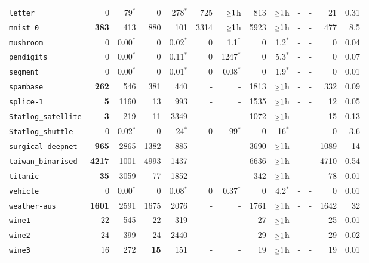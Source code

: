 \begin{tabular}{lrrrrrrrrrrrr}
\texttt{letter} & 0 & 79$^*$ & 0 & 278$^*$ & 725 & $\mathsmaller{\geq}1$h & 813 & $\mathsmaller{\geq}1$h & - & - & 21 & 0.31\\
\texttt{mnist\_0} & \textbf{383} & 413 & 880 & 101 & 3314 & $\mathsmaller{\geq}1$h & 5923 & $\mathsmaller{\geq}1$h & - & - & 477 & 8.5\\
\texttt{mushroom} & 0 & 0.00$^*$ & 0 & 0.02$^*$ & 0 & 1.1$^*$ & 0 & 1.2$^*$ & - & - & 0 & 0.04\\
\texttt{pendigits} & 0 & 0.00$^*$ & 0 & 0.11$^*$ & 0 & 1247$^*$ & 0 & 5.3$^*$ & - & - & 0 & 0.07\\
\texttt{segment} & 0 & 0.00$^*$ & 0 & 0.01$^*$ & 0 & 0.08$^*$ & 0 & 1.9$^*$ & - & - & 0 & 0.01\\
\texttt{spambase} & \textbf{262} & 546 & 381 & 440 & - & - & 1813 & $\mathsmaller{\geq}1$h & - & - & 332 & 0.09\\
\texttt{splice-1} & \textbf{5} & 1160 & 13 & 993 & - & - & 1535 & $\mathsmaller{\geq}1$h & - & - & 12 & 0.05\\
\texttt{Statlog\_satellite} & \textbf{3} & 219 & 11 & 3349 & - & - & 1072 & $\mathsmaller{\geq}1$h & - & - & 15 & 0.13\\
\texttt{Statlog\_shuttle} & 0 & 0.02$^*$ & 0 & 24$^*$ & 0 & 99$^*$ & 0 & 16$^*$ & - & - & 0 & 3.6\\
\texttt{surgical-deepnet} & \textbf{965} & 2865 & 1382 & 885 & - & - & 3690 & $\mathsmaller{\geq}1$h & - & - & 1089 & 14\\
\texttt{taiwan\_binarised} & \textbf{4217} & 1001 & 4993 & 1437 & - & - & 6636 & $\mathsmaller{\geq}1$h & - & - & 4710 & 0.54\\
\texttt{titanic} & \textbf{35} & 3059 & 77 & 1852 & - & - & 342 & $\mathsmaller{\geq}1$h & - & - & 78 & 0.01\\
\texttt{vehicle} & 0 & 0.00$^*$ & 0 & 0.08$^*$ & 0 & 0.37$^*$ & 0 & 4.2$^*$ & - & - & 0 & 0.01\\
\texttt{weather-aus} & \textbf{1601} & 2591 & 1675 & 2076 & - & - & 1761 & $\mathsmaller{\geq}1$h & - & - & 1642 & 32\\
\texttt{wine1} & 22 & 545 & 22 & 319 & - & - & 27 & $\mathsmaller{\geq}1$h & - & - & 25 & 0.01\\
\texttt{wine2} & 24 & 399 & 24 & 2440 & - & - & 29 & $\mathsmaller{\geq}1$h & - & - & 29 & 0.02\\
\texttt{wine3} & 16 & 272 & \textbf{15} & 151 & - & - & 19 & $\mathsmaller{\geq}1$h & - & - & 19 & 0.01\\
\bottomrule
\end{tabular}
